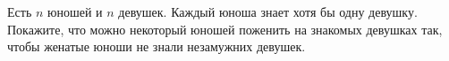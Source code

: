 Есть $n$ юношей и $n$ девушек. Каждый юноша знает хотя бы одну девушку. Покажите, что можно некоторый
юношей поженить на знакомых девушках так, чтобы женатые юноши не знали незамужних девушек.
